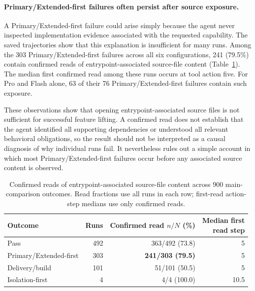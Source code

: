 \documentclass[acmsmall,screen,review,anonymous]{acmart}
\begin{document}
\paragraph{Primary/Extended-first failures often persist after source exposure.}
A Primary/Extended-first failure could arise simply because the agent never inspected
implementation evidence associated with the requested capability. The saved
trajectories show that this explanation is insufficient for many runs. Among the
303 Primary/Extended-first failures across all six configurations, 241 (79.5\%)
contain confirmed reads of entrypoint-associated source-file content
(Table~\ref{tab:source-exposure}). The median first confirmed read among these runs occurs at tool action
five. For Pro and Flash alone, 63 of their 76 Primary/Extended-first failures contain
such exposure.

These observations show that opening entrypoint-associated source files is not
sufficient for successful feature lifting. A confirmed read does not establish
that the agent identified all supporting dependencies or understood all relevant
behavioral obligations, so the result should not be interpreted as a causal diagnosis
of why individual runs fail. It nevertheless rules out a simple account in
which most Primary/Extended-first failures occur before any associated source content is
observed.

\begin{table}[htbp]
  \centering
    \caption{Confirmed reads of entrypoint-associated source-file content across
    900 main-comparison outcomes. Read fractions use all runs in each row;
    first-read action-step medians use only confirmed reads.}
    \label{tab:source-exposure}

    \centering
    \footnotesize

    \begin{tabular}{@{}lrrr@{}}
      \toprule
      Outcome
        & Runs
        & \shortstack{Confirmed read\\$n/N$ (\%)}
        & \shortstack{Median first\\read step} \\
      \midrule
      Pass & 492 & 363/492 (73.8) & 5 \\
      Primary/Extended-first & 303 & \textbf{241/303 (79.5)} & 5 \\
      Delivery/build & 101 & 51/101 (50.5) & 5 \\
      Isolation-first & 4 & 4/4 (100.0) & 10.5 \\

      \bottomrule
    \end{tabular}

\end{table}
\end{document}
